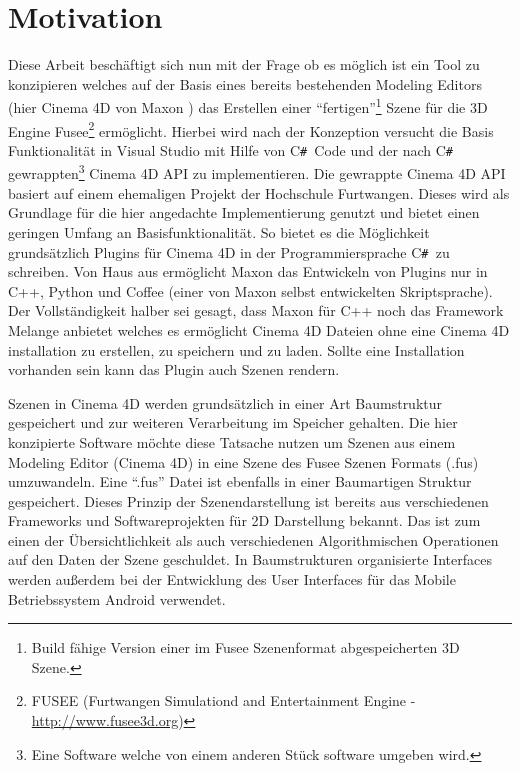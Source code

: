 \documentclass[pagesize, paper=a4, fontsize=12pt,titlepage=true, headings=small, headnosepline, abstractoff, liststotoc, nochapterprefix, plainheadsepline, twoside]{scrreprt}
\newcommand{\CSS}{C\texttt{\# }}
\begin{document}
\section{Motivation}
Diese Arbeit beschäftigt sich nun mit der Frage ob es möglich ist ein Tool zu konzipieren welches auf der Basis eines bereits bestehenden Modeling Editors (hier Cinema 4D von Maxon ) das Erstellen einer “fertigen”\footnote{Build fähige Version einer im Fusee Szenenformat abgespeicherten 3D Szene.} Szene für die 3D Engine Fusee\footnote{FUSEE (Furtwangen Simulationd and Entertainment Engine - \url{http://www.fusee3d.org})} ermöglicht. Hierbei wird nach der Konzeption versucht die Basis Funktionalität in Visual Studio mit Hilfe von \CSS Code und der nach \CSS gewrappten\footnote{Eine Software welche von einem anderen Stück software umgeben wird.} Cinema 4D API zu implementieren. Die gewrappte Cinema 4D API basiert auf einem ehemaligen Projekt der Hochschule Furtwangen. Dieses wird als Grundlage für die hier angedachte Implementierung genutzt und bietet einen geringen Umfang an Basisfunktionalität. So bietet es die Möglichkeit grundsätzlich Plugins für Cinema 4D in der Programmiersprache \CSS zu schreiben. Von Haus aus ermöglicht Maxon das Entwickeln von Plugins nur in C++, Python und Coffee (einer von Maxon selbst entwickelten Skriptsprache). Der Vollständigkeit halber sei gesagt, dass Maxon für C++ noch das Framework Melange anbietet welches es ermöglicht Cinema 4D Dateien ohne eine Cinema 4D installation zu erstellen, zu speichern und zu laden. Sollte eine Installation vorhanden sein kann das Plugin auch Szenen rendern.

Szenen in Cinema 4D werden grundsätzlich in einer Art Baumstruktur gespeichert und zur weiteren Verarbeitung im Speicher gehalten. Die hier konzipierte Software möchte diese Tatsache nutzen um Szenen aus einem Modeling Editor (Cinema 4D) in eine Szene des Fusee Szenen Formats (.fus) umzuwandeln. Eine “.fus” Datei ist ebenfalls in einer Baumartigen Struktur gespeichert. Dieses Prinzip der Szenendarstellung ist bereits aus verschiedenen Frameworks und Softwareprojekten für 2D Darstellung bekannt. Das ist zum einen der Übersichtlichkeit als auch verschiedenen Algorithmischen Operationen auf den Daten der Szene geschuldet. In Baumstrukturen organisierte Interfaces werden außerdem bei der Entwicklung des User Interfaces für das Mobile Betriebssystem Android verwendet.
\end{document}
